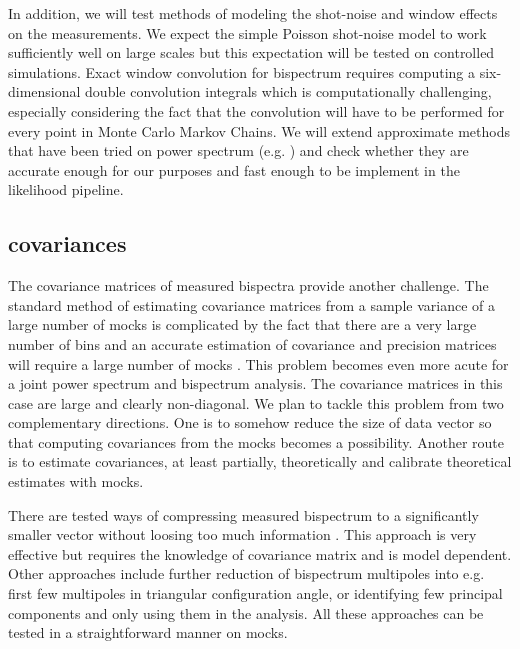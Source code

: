 In addition, we will test methods of modeling the shot-noise and window effects
on the measurements. We expect the simple Poisson shot-noise model to work
sufficiently well on large scales but this expectation will be tested on
controlled simulations. Exact window convolution for bispectrum requires
computing a six-dimensional double convolution integrals which is
computationally challenging, especially considering the fact that the
convolution will have to be performed for every point in Monte Carlo Markov
Chains. We will extend approximate methods that have been tried on power
spectrum (e.g. \cite{2017MNRAS.464.3121W}) and check whether they are accurate
enough for our purposes and fast enough to be implement in the likelihood
pipeline. 

\subsection*{covariances}

The covariance matrices of measured bispectra provide another challenge. The
standard method of estimating covariance matrices from a sample variance of a
large number of mocks is complicated by the fact that there are a very large
number of bins and an accurate estimation of covariance and precision matrices
will require a large number of mocks
\cite{2006MNRAS.371.1188H,2007A&A...464..399H,2013MNRAS.432.1928T,2013PhRvD..88f3537D,2014MNRAS.439.2531P,2014MNRAS.442.2728T}.
This problem becomes even more acute for a joint power spectrum and bispectrum
analysis. The covariance matrices in this case are large and clearly
non-diagonal.  We plan to tackle this problem from two complementary
directions. One is to somehow reduce the size of data vector so that computing
covariances from the mocks becomes a possibility. Another route is to estimate
covariances, at least partially, theoretically and calibrate theoretical
estimates with mocks. 

There are tested ways of compressing measured bispectrum to a significantly
smaller vector without loosing too much information
\cite{2000MNRAS.317..965H,2016PhRvD..93h3525Z,2017MNRAS.471.1581B,2017MNRAS.472.4244H,2018MNRAS.476.4045G}.
This approach is very effective but requires the knowledge of covariance matrix
and is model dependent. Other approaches include further reduction of
bispectrum multipoles into e.g. first few multipoles in triangular
configuration angle, or identifying few principal components and only using
them in the analysis. All these approaches can be tested in a straightforward
manner on mocks.

